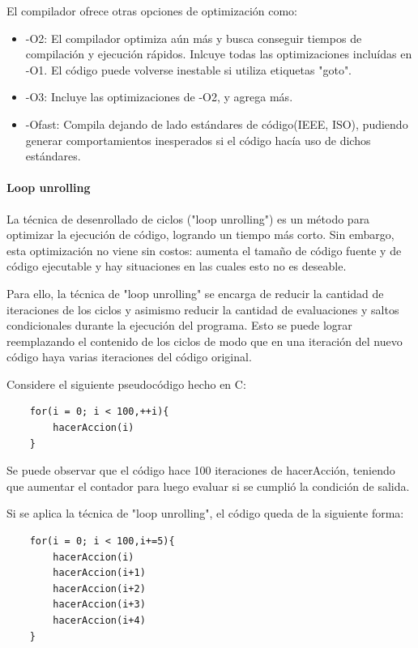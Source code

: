	El compilador ofrece otras opciones de optimización como:
	
	\begin{itemize}

	\item -O2: El compilador optimiza aún más y busca conseguir tiempos de compilación y ejecución rápidos. Inlcuye todas las optimizaciones incluídas en -O1. El código puede volverse inestable si utiliza etiquetas "goto".
	
	\item -O3: Incluye las optimizaciones de -O2, y agrega más.
	
	\item -Ofast: Compila dejando de lado estándares de código(IEEE, ISO), pudiendo generar comportamientos inesperados si el código hacía uso de dichos estándares.

	\end{itemize}
	
	\paragraph{Loop unrolling}
	
	La técnica de desenrollado de ciclos ("loop unrolling") es un método para optimizar la ejecución de código, logrando un tiempo más corto. Sin embargo, esta optimización no viene sin costos: aumenta el tamaño de código fuente y de código ejecutable y hay situaciones en las cuales esto no es deseable.

	Para ello, la técnica de "loop unrolling" se encarga de reducir la cantidad de iteraciones de los ciclos y asimismo reducir la cantidad de evaluaciones y saltos condicionales durante la ejecución del programa. Esto se puede lograr reemplazando el contenido de los ciclos de modo que en una iteraci\'on del nuevo c\'odigo haya varias iteraciones del c\'odigo original.

	Considere el siguiente pseudocódigo hecho en C:

\begin{verbatim}
	for(i = 0; i < 100,++i){
	    hacerAccion(i)
	}
\end{verbatim}

Se puede observar que el código hace 100 iteraciones de hacerAcción, teniendo que aumentar el contador para luego evaluar si se cumplió la condición de salida.

Si se aplica la técnica de "loop unrolling", el código queda de la siguiente forma:

\begin{verbatim}
    for(i = 0; i < 100,i+=5){
        hacerAccion(i)
        hacerAccion(i+1)
        hacerAccion(i+2)
        hacerAccion(i+3)
        hacerAccion(i+4)
    }
\end{verbatim}

